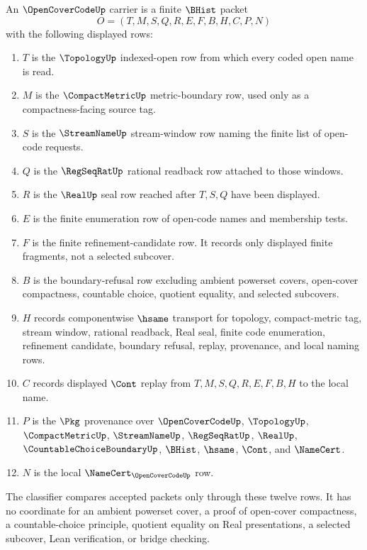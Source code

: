 \begin{definition}
\label{def:open-cover-code-carrier}
An $\OpenCoverCodeUp$ carrier is a finite $\BHist$ packet
$$
O=(T,M,S,Q,R,E,F,B,H,C,P,N)
$$
with the following displayed rows:
\begin{enumerate}
\item $T$ is the $\TopologyUp$ indexed-open row from which every coded open name is read.
\item $M$ is the $\CompactMetricUp$ metric-boundary row, used only as a compactness-facing source tag.
\item $S$ is the $\StreamNameUp$ stream-window row naming the finite list of open-code requests.
\item $Q$ is the $\RegSeqRatUp$ rational readback row attached to those windows.
\item $R$ is the $\RealUp$ seal row reached after $T,S,Q$ have been displayed.
\item $E$ is the finite enumeration row of open-code names and membership tests.
\item $F$ is the finite refinement-candidate row. It records only displayed finite fragments, not a selected subcover.
\item $B$ is the boundary-refusal row excluding ambient powerset covers, open-cover compactness, countable choice, quotient equality, and selected subcovers.
\item $H$ records componentwise $\hsame$ transport for topology, compact-metric tag, stream window, rational readback, Real seal, finite code enumeration, refinement candidate, boundary refusal, replay, provenance, and local naming rows.
\item $C$ records displayed $\Cont$ replay from $T,M,S,Q,R,E,F,B,H$ to the local name.
\item $P$ is the $\Pkg$ provenance over $\OpenCoverCodeUp$, $\TopologyUp$, $\CompactMetricUp$, $\StreamNameUp$, $\RegSeqRatUp$, $\RealUp$, $\CountableChoiceBoundaryUp$, $\BHist$, $\hsame$, $\Cont$, and $\NameCert$.
\item $N$ is the local $\NameCert_{\OpenCoverCodeUp}$ row.
\end{enumerate}
The classifier compares accepted packets only through these twelve rows. It has no coordinate for an ambient powerset cover, a proof of open-cover compactness, a countable-choice principle, quotient equality on Real presentations, a selected subcover, Lean verification, or bridge checking.
\end{definition}

